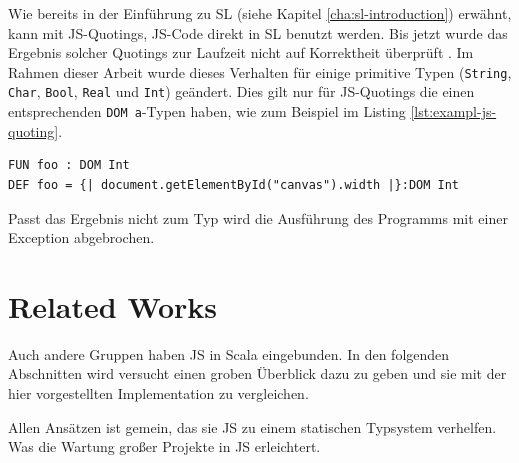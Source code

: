 \documentclass[12pt,bibtotoc]{scrreprt}
\begin{document}
Wie bereits in der Einführung zu SL (siehe Kapitel \ref{cha:sl-introduction}) erwähnt, kann mit JS-Quotings, JS-Code direkt in SL benutzt werden. Bis jetzt wurde das Ergebnis solcher Quotings zur Laufzeit nicht auf Korrektheit überprüft \cite[S. 29]{Bisping2013}. Im Rahmen dieser Arbeit wurde dieses Verhalten für einige primitive Typen (\lstinline!String!, \lstinline!Char!, \lstinline!Bool!, \lstinline!Real! und \lstinline!Int!) geändert. Dies gilt nur für JS-Quotings die einen entsprechenden \lstinline!DOM a!-Typen haben, wie zum Beispiel im Listing \ref{lst:exampl-js-quoting}.

\begin{lstlisting}[caption={Beispiel: JS-Quoting Monade}, label=lst:exampl-js-quoting]
FUN foo : DOM Int
DEF foo = {| document.getElementById("canvas").width |}:DOM Int
\end{lstlisting}

Passt das Ergebnis nicht zum Typ wird die Ausführung des Programms mit einer Exception abgebrochen. 

\chapter{Related Works}
\label{chap:related-works}

%



Auch andere Gruppen haben JS in Scala eingebunden. In den folgenden Abschnitten wird versucht einen groben Überblick dazu zu geben und sie mit der hier vorgestellten Implementation zu vergleichen. 

Allen Ansätzen ist gemein, das sie JS zu einem statischen Typsystem verhelfen. Was die Wartung großer Projekte in JS erleichtert. 
\end{document}
